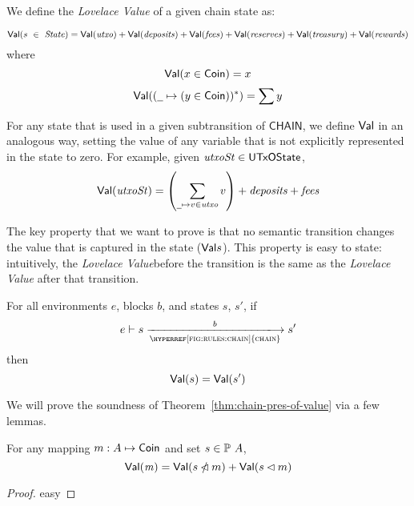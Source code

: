 We define the \emph{Lovelace Value} of a given chain state as:
\begin{definition}
  \label{def:val}
  \begin{equation*}
    \mathsf{Val}(s~\in~\mathit{State}) =
        \mathsf{Val}(\mathit{utxo}) +
            \mathsf{Val}(\mathit{deposits}) +
            \mathsf{Val}(\mathit{fees}) +
            \mathsf{Val}(\mathit{reserves}) +
            \mathsf{Val}(\mathit{treasury}) +
            \mathsf{Val}(\mathit{rewards})
  \end{equation*}
  where
  \begin{equation*}
      \mathsf{Val}(x \in \mathsf{Coin}) = x
  \end{equation*}
  \begin{equation*}
      \Val((\wcard\mapsto (y \in \Coin))^{*}) = \sum y
  \end{equation*}
\end{definition}

\noindent
For any state that is used in a given subtransition of $\mathsf{CHAIN}$,
we define $\mathsf{Val}{}$ in an analogous way, setting the value of any variable that is not explicitly
represented in the state to zero.
For example, given $\mathit{utxoSt}\in\mathsf{UTxOState}$,
\begin{equation*}
  \Val(\var{utxoSt}) =
  \left(\sum_{\wcard\mapsto v\in\var{utxo}}v\right) + \var{deposits} + \var{fees}
\end{equation*}

\noindent
The key property that we want to prove is that no semantic transition changes the value that
is captured in the state ($\mathsf{Val}{s}$).
This property is easy to state: intuitively,
the \emph{Lovelace Value}before the transition is the same as the
\emph{Lovelace Value} after that transition.

\begin{theorem}
  \label{thm:chain-pres-of-value}
  For all environments $e$, blocks $b$, and states $s$, $s'$, if
  \begin{equation*}
    e\vdash s\trans{\hyperref[fig:rules:chain]{chain}}{b}s'
  \end{equation*}
  then
  \begin{equation*}
    \mathsf{Val}(s) = \mathsf{Val}(s')
  \end{equation*}
\end{theorem}

\noindent
We will prove the soundness of Theorem~\ref{thm:chain-pres-of-value} via a few lemmas.

\begin{lemma}
  \label{lemma:value-sum-pres-1}
  For any mapping $m:A\mapsto\mathsf{Coin}$ and set $s\in\mathbb{P}~A$,
  \begin{equation*}
    \mathsf{Val}(\mathit{m}) = \mathsf{Val}(s\mathbin{\slashed{\lhd}} m) + \mathsf{Val}(s\lhd m)
  \end{equation*}
\end{lemma}
\begin{proof}
  easy
\end{proof}

